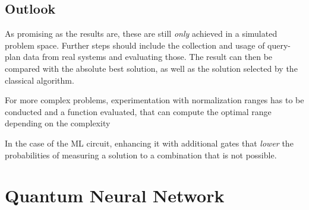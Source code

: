 \subsection{Outlook}
As promising as the results are, these are still \emph{only} achieved in a simulated problem space. Further steps should include the collection and usage of query-plan data from real systems and evaluating those. The result can then be compared with the absolute best solution, as well as the solution selected by the classical algorithm. \par
For more complex problems, experimentation with normalization ranges has to be conducted and a function evaluated, that can compute the optimal range depending on the complexity\par
In the case of the ML circuit, enhancing it with additional gates that \emph{lower} the probabilities of measuring a solution to a combination that is not possible.

\newpage

\section{Quantum Neural Network}
